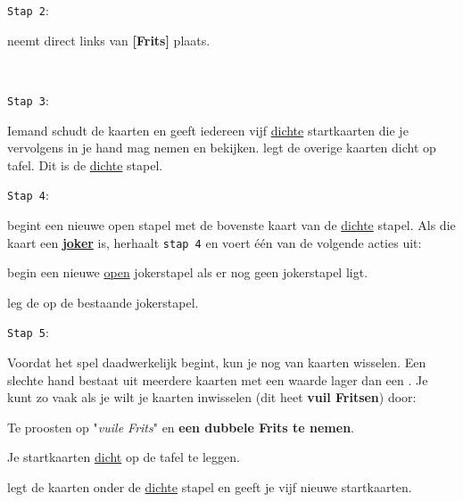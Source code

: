 \noindent
\begin{minipage}[t]{.09\textwidth}
\texttt{Stap 2}:
\end{minipage}
\hfill
\begin{minipage}[t]{.91\textwidth}
\Willem neemt direct links van \textbf{[Frits]} plaats. 
\end{minipage}
\\

\noindent
\begin{minipage}[t]{.09\textwidth}
\texttt{Stap 3}:
\end{minipage}
\hfill
\begin{minipage}[t]{.91\textwidth}
Iemand schudt de kaarten en \Frits geeft iedereen vijf \ul{dichte} startkaarten die je vervolgens in je hand mag nemen en bekijken. \Frits legt de overige kaarten dicht op tafel. Dit is de \ul{dichte} stapel. \\
\end{minipage}

\noindent
\begin{minipage}[t]{.09\textwidth}
\texttt{Stap 4}:
\end{minipage}
\hfill
\begin{minipage}[t]{.91\textwidth}
\Frits begint een nieuwe open stapel met de bovenste kaart van de \ul{dichte} stapel. Als die kaart een \textbf{\ul{joker}} is, herhaalt \Frits \texttt{stap 4} en voert \'e\'en van de volgende acties uit:
\puntLijst{}
    \item begin een nieuwe \ul{open} jokerstapel als er nog geen jokerstapel ligt.
    \item leg de  op de bestaande jokerstapel.
\eindPuntLijst{}
\end{minipage}

\vspace*{+0.35cm} 

\noindent
\begin{minipage}[t]{.09\textwidth}
\texttt{Stap 5}:
\end{minipage}
\hfill
\begin{minipage}[t]{.91\textwidth}
Voordat het spel daadwerkelijk begint, kun je nog van kaarten wisselen. Een slechte hand bestaat uit meerdere kaarten met een waarde lager dan een . Je kunt zo vaak als je wilt je kaarten inwisselen (dit heet \textbf{vuil Fritsen}) door:
\numeriekeLijst{}
    \item Te proosten op "\textit{vuile Frits}" en \textbf{een dubbele Frits te nemen}.
    \item Je startkaarten \ul{dicht} op de tafel te leggen.
    \item \Frits legt de kaarten onder de \ul{dichte} stapel en geeft je vijf nieuwe startkaarten.
\eindNumeriekeLijst{}
\end{minipage}
\vspace*{+0.3cm} 
    
